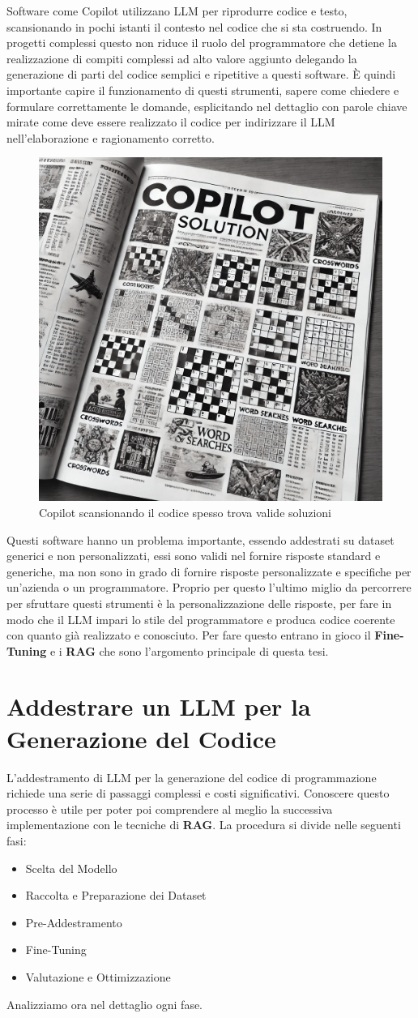\documentclass[12pt,a4paper,openright,twoside]{book}
\begin{document}
Software come Copilot utilizzano LLM per riprodurre codice e testo, scansionando in pochi istanti il contesto nel codice che si sta costruendo.
In progetti complessi questo non riduce il ruolo del programmatore che detiene la realizzazione di compiti complessi ad alto valore aggiunto delegando la generazione di parti del codice semplici e ripetitive a questi software.
\`E quindi importante capire il funzionamento di questi strumenti, sapere come chiedere e formulare correttamente le domande, esplicitando nel dettaglio con parole chiave mirate come deve essere realizzato il codice per indirizzare il \ac{LLM} nell'elaborazione e ragionamento corretto.
\begin{figure}[h]
    \centering
    \includegraphics[width=0.5\linewidth]{figures/copilotsolutionSettimanaEnigmistica.png}
    \caption{Copilot scansionando il codice spesso trova valide soluzioni}
    \label{fig:Copilot-Solution}
\end{figure}
Questi software hanno un problema importante, essendo addestrati su dataset generici e non personalizzati, essi sono validi nel fornire risposte standard e generiche, ma non sono in grado di fornire risposte personalizzate e specifiche per un'azienda o un programmatore.
Proprio per questo l'ultimo miglio da percorrere per sfruttare questi strumenti è la personalizzazione delle risposte, per fare in modo che il LLM impari lo stile del programmatore e produca codice coerente con quanto già realizzato e conosciuto.
Per fare questo entrano in gioco il \textbf{Fine-Tuning} e i \textbf{RAG} che sono l'argomento principale di questa tesi.
\chapter{Addestrare un LLM per la Generazione del Codice}

L'addestramento di LLM per la generazione del codice di programmazione richiede una serie di passaggi complessi e costi significativi.
Conoscere questo processo è utile per poter poi comprendere al meglio la successiva implementazione con le tecniche di \textbf{RAG}.
La procedura si divide nelle seguenti fasi:
\begin{itemize}
    \item Scelta del Modello
    \item Raccolta e Preparazione dei Dataset
    \item Pre-Addestramento
    \item Fine-Tuning
    \item Valutazione e Ottimizzazione
\end{itemize}
Analizziamo ora nel dettaglio ogni fase.
\end{document}
